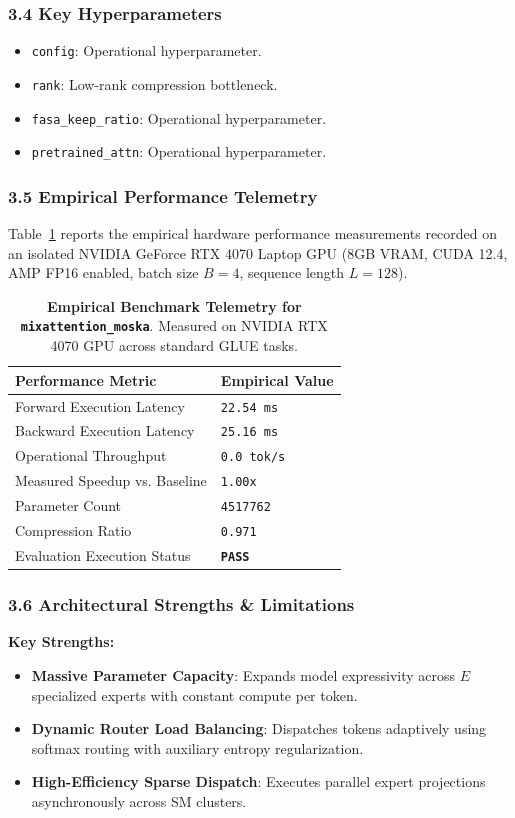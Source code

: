 \subsubsection*{3.4 Key Hyperparameters}
\begin{itemize}
    \item \texttt{config}: Operational hyperparameter.
    \item \texttt{rank}: Low-rank compression bottleneck.
    \item \texttt{fasa\_keep\_ratio}: Operational hyperparameter.
    \item \texttt{pretrained\_attn}: Operational hyperparameter.
\end{itemize}

\subsubsection*{3.5 Empirical Performance Telemetry}
Table~\ref{tab:telemetry_mixattention\_moska} reports the empirical hardware performance measurements recorded on an isolated NVIDIA GeForce RTX 4070 Laptop GPU (8GB VRAM, CUDA 12.4, AMP FP16 enabled, batch size $B=4$, sequence length $L=128$).

\begin{table}[h]
\centering
\small
\caption{\textbf{Empirical Benchmark Telemetry for \texttt{mixattention\_moska}}. Measured on NVIDIA RTX 4070 GPU across standard GLUE tasks.}
\label{tab:telemetry_mixattention\_moska}
\begin{tabularx}{\columnwidth}{lX}
\toprule
\textbf{Performance Metric} & \textbf{Empirical Value} \\
\midrule
Forward Execution Latency & \texttt{22.54 ms} \\
Backward Execution Latency & \texttt{25.16 ms} \\
Operational Throughput & \texttt{0.0 tok/s} \\
Measured Speedup vs. Baseline & \texttt{1.00x} \\
Parameter Count & \texttt{4517762} \\
Compression Ratio & \texttt{0.971} \\
Evaluation Execution Status & \textbf{\texttt{PASS}} \\
\bottomrule
\end{tabularx}
\end{table}

\subsubsection*{3.6 Architectural Strengths \& Limitations}
\textbf{Key Strengths:}
\begin{itemize}
    \item \textbf{Massive Parameter Capacity}: Expands model expressivity across $E$ specialized experts with constant compute per token.
    \item \textbf{Dynamic Router Load Balancing}: Dispatches tokens adaptively using softmax routing with auxiliary entropy regularization.
    \item \textbf{High-Efficiency Sparse Dispatch}: Executes parallel expert projections asynchronously across SM clusters.
\end{itemize}

